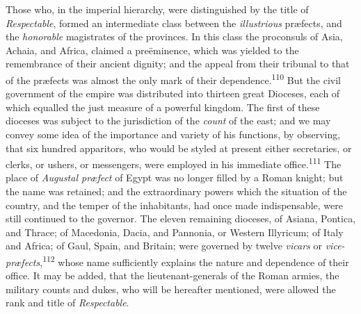 Those who, in the imperial hierarchy, were distinguished by the
title of \textit{Respectable}, formed an intermediate class between the
\textit{illustrious} præfects, and the \textit{honorable} magistrates of the
provinces. In this class the proconsuls of Asia, Achaia, and
Africa, claimed a preëminence, which was yielded to the
remembrance of their ancient dignity; and the appeal from their
tribunal to that of the præfects was almost the only mark of
their dependence.\textsuperscript{110} But the civil government of the empire was
distributed into thirteen great Dioceses, each of which equalled
the just measure of a powerful kingdom. The first of these
dioceses was subject to the jurisdiction of the \textit{count} of the
east; and we may convey some idea of the importance and variety
of his functions, by observing, that six hundred apparitors, who
would be styled at present either secretaries, or clerks, or
ushers, or messengers, were employed in his immediate office.\textsuperscript{111}
The place of \textit{Augustal præfect} of Egypt was no longer filled by
a Roman knight; but the name was retained; and the extraordinary
powers which the situation of the country, and the temper of the
inhabitants, had once made indispensable, were still continued to
the governor. The eleven remaining dioceses, of Asiana, Pontica,
and Thrace; of Macedonia, Dacia, and Pannonia, or Western
Illyricum; of Italy and Africa; of Gaul, Spain, and Britain; were
governed by twelve \textit{vicars} or \textit{vice-præfects},\textsuperscript{112} whose name
sufficiently explains the nature and dependence of their office.
It may be added, that the lieutenant-generals of the Roman
armies, the military counts and dukes, who will be hereafter
mentioned, were allowed the rank and title of \textit{Respectable}.




